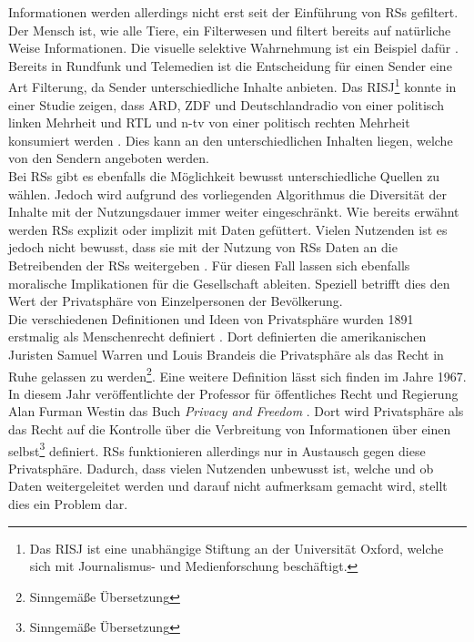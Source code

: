 Informationen werden allerdings nicht erst seit der Einführung von \acp{RS} gefiltert.
Der Mensch ist, wie alle Tiere, ein \glqq Filterwesen\grqq{} und filtert bereits auf natürliche Weise Informationen.
Die visuelle selektive Wahrnehmung ist ein Beispiel dafür \cite{selective-perception}.
Bereits in Rundfunk und Telemedien ist die Entscheidung für einen Sender eine Art Filterung, da Sender unterschiedliche Inhalte anbieten.
Das \ac{RISJ}\footnote{Das \ac{RISJ} ist eine unabhängige Stiftung an der Universität Oxford, welche sich mit Journalismus- und Medienforschung beschäftigt.} konnte in einer Studie zeigen, dass ARD, ZDF und Deutschlandradio von einer politisch linken Mehrheit und RTL und n-tv von einer politisch rechten Mehrheit konsumiert werden \cite{public-service-news}.
Dies kann an den unterschiedlichen Inhalten liegen, welche von den Sendern angeboten werden. \\

Bei \acp{RS} gibt es ebenfalls die Möglichkeit bewusst unterschiedliche Quellen zu wählen.
Jedoch wird aufgrund des vorliegenden Algorithmus die Diversität der Inhalte mit der Nutzungsdauer immer weiter eingeschränkt.
Wie bereits erwähnt werden \acp{RS} explizit oder implizit mit Daten gefüttert.
Vielen Nutzenden ist es jedoch nicht bewusst, dass sie mit der Nutzung von \acp{RS} Daten an die Betreibenden der \acp{RS} weitergeben \cite{privacy-rs}.
Für diesen Fall lassen sich ebenfalls moralische Implikationen für die Gesellschaft ableiten.
Speziell betrifft dies den Wert der Privatsphäre von Einzelpersonen der Bevölkerung.\\

Die verschiedenen Definitionen und Ideen von Privatsphäre wurden 1891 erstmalig als Menschenrecht definiert \cite{history-of-privacy}.
Dort definierten die amerikanischen Juristen Samuel Warren und Louis Brandeis die Privatsphäre als \glqq das Recht in Ruhe gelassen zu werden\grqq{}\footnote{Sinngemäße Übersetzung}.
Eine weitere Definition lässt sich finden im Jahre 1967.
In diesem Jahr veröffentlichte der Professor für öffentliches Recht und Regierung Alan Furman Westin das Buch \textit{Privacy and Freedom} \cite{privacy-and-freedom}.
Dort wird Privatsphäre als \glqq das Recht auf die Kontrolle über die Verbreitung von Informationen über einen selbst\grqq{}\footnote{Sinngemäße Übersetzung} definiert.
\acp{RS} funktionieren allerdings nur in Austausch gegen diese Privatsphäre.
Dadurch, dass vielen Nutzenden unbewusst ist, welche und ob Daten weitergeleitet werden und darauf nicht aufmerksam gemacht wird, stellt dies ein Problem dar. \\

